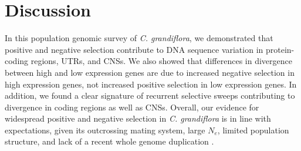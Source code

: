 \section{Discussion}
In this population genomic survey of \textit{C. grandiflora}, we demonstrated that positive and negative selection contribute to DNA sequence variation in protein-coding regions, UTRs, and CNSs. We also showed that differences in divergence between high and low expression genes are due to increased negative selection in high expression genes, not increased positive selection in low expression genes. In addition, we found a clear signature of recurrent selective sweeps contributing to divergence in coding regions as well as CNSs. Overall, our evidence for widespread positive and negative selection in \textit{C. grandiflora} is in line with expectations, given its outcrossing mating system, large $N_{e}$, limited population structure, and lack of a recent whole genome duplication \citep{hough2013}.

